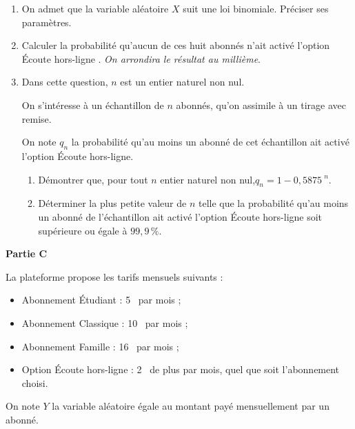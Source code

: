 \documentclass[10pt]{article}
\providecommand{\euro}{\texteuro}
\providecommand{\np}[2][]{{#2~#1}}
\providecommand{\euro}{{\text{€}}}
\renewcommand{\euro}{\ifmmode\text{\texteuro}\else\texteuro\fi}
\begin{document}
\begin{enumerate}
\item On admet que la variable aléatoire $X$ suit une loi binomiale. Préciser ses paramètres.
\item Calculer la probabilité qu'aucun de ces huit abonnés n'ait activé l'option \og Écoute hors-ligne \fg{}. \emph{On arrondira le résultat au millième}.
\item Dans cette question, $n$ est un entier naturel non nul.

On s'intéresse à un échantillon de $n$ abonnés, qu'on assimile à un tirage avec remise.

On note $q_{n}$ la probabilité qu'au moins un abonné de cet échantillon ait activé l'option \og Écoute hors-ligne\fg{}.

	\begin{enumerate}
		\item Démontrer que, pour tout $n$ entier naturel non nul,\quad $q_{n}=1- \np{0,5875}^{n}$.
		\item Déterminer la plus petite valeur de $n$ telle que la probabilité qu'au moins un abonné de l'échantillon ait activé l'option \og Écoute hors-ligne\fg{} soit supérieure ou égale à $99,9\,\%$.
	\end{enumerate}
\end{enumerate}

\textbf{Partie C}

La plateforme propose les tarifs mensuels suivants :

\begin{itemize}
\item Abonnement \og Étudiant\fg{} : 5~\euro{} par mois ;
\item Abonnement \og Classique\fg{} : 10~\euro{} par mois ;
\item Abonnement \og Famille \fg{} : 16~\euro{} par mois ;
\item Option \og Écoute hors-ligne\fg{} : 2~\euro{} de plus par mois, quel que soit l'abonnement choisi.
\end{itemize}

On note $Y$ la variable aléatoire égale au montant payé mensuellement par un abonné.
\end{document}
